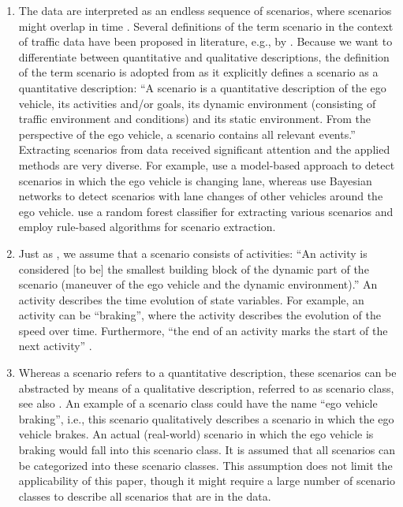 \begin{enumerate}
	\item The data are interpreted as an endless sequence of scenarios, where scenarios might overlap in time \cite{elrofai2018scenario}. Several definitions of the term scenario in the context of traffic data have been proposed in literature, e.g., by \textcite{geyer2014, ulbrich2015, elrofai2016scenario, elrofai2018scenario}. Because we want to differentiate between quantitative and qualitative descriptions, the definition of the term scenario is adopted from \textcite{elrofai2018scenario} as it explicitly defines a scenario as a quantitative description: ``A scenario is a quantitative description of the ego vehicle, its activities and/or goals, its dynamic environment (consisting of traffic environment and conditions) and its static environment. From the perspective of the ego vehicle, a scenario contains all relevant events.'' \cstart Extracting scenarios from data received significant attention and the applied methods are very diverse. For example, \textcite{elrofai2016scenario} use a model-based approach to detect scenarios in which the ego vehicle is changing lane, whereas \textcite{kasper2012oobayesnetworks} use Bayesian networks to detect scenarios with lane changes of other vehicles around the ego vehicle. \textcite{xie2017driving} use a random forest classifier for extracting various scenarios and \textcite{paardekooper2019dataset3000km} employ rule-based algorithms for scenario extraction. \cend
	
	\item Just as \textcite{elrofai2018scenario}, we assume that a scenario consists of activities: ``An activity is considered [to be] the smallest building block of the dynamic part of the scenario (maneuver of the ego vehicle and the dynamic environment).'' An activity describes the time evolution of state variables. For example, an activity can be ``braking'', where the activity describes the evolution of the speed over time. Furthermore, ``the end of an activity marks the start of the next activity'' \cite{elrofai2018scenario}.
	
	\item Whereas a scenario refers to a quantitative description, these scenarios can be abstracted by means of a qualitative description, referred to as scenario class, see also \textcite{ploeg2018cetran, elrofai2018scenario}. An example of a scenario class could have the name ``ego vehicle braking'', i.e., this scenario qualitatively describes a scenario in which the ego vehicle brakes. An actual (real-world) scenario in which the ego vehicle is braking would fall into this scenario class. It is assumed that all scenarios can be categorized into these scenario classes. This assumption does not limit the applicability of this paper, though it might require a large number of scenario classes to describe all scenarios that are in the data.
	

\end{enumerate}
